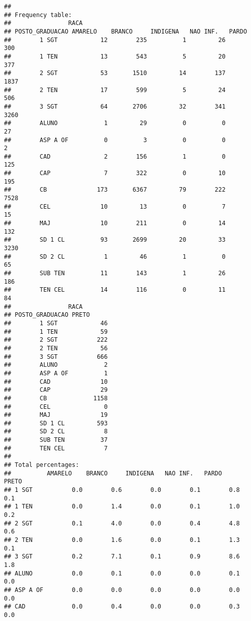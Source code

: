 \documentclass[
]{article}
\begin{document}
\begin{verbatim}
## 
## Frequency table:
##                RACA
## POSTO_GRADUACAO AMARELO    BRANCO     INDIGENA   NAO INF.   PARDO     
##        1 SGT            12        235          1         26        300
##        1 TEN            13        543          5         20        377
##        2 SGT            53       1510         14        137       1837
##        2 TEN            17        599          5         24        506
##        3 SGT            64       2706         32        341       3260
##        ALUNO             1         29          0          0         27
##        ASP A OF          0          3          0          0          2
##        CAD               2        156          1          0        125
##        CAP               7        322          0         10        195
##        CB              173       6367         79        222       7528
##        CEL              10         13          0          7         15
##        MAJ              10        211          0         14        132
##        SD 1 CL          93       2699         20         33       3230
##        SD 2 CL           1         46          1          0         65
##        SUB TEN          11        143          1         26        186
##        TEN CEL          14        116          0         11         84
##                RACA
## POSTO_GRADUACAO PRETO     
##        1 SGT            46
##        1 TEN            59
##        2 SGT           222
##        2 TEN            56
##        3 SGT           666
##        ALUNO             2
##        ASP A OF          1
##        CAD              10
##        CAP              29
##        CB             1158
##        CEL               0
##        MAJ              19
##        SD 1 CL         593
##        SD 2 CL           8
##        SUB TEN          37
##        TEN CEL           7
## 
## Total percentages:
##          AMARELO    BRANCO     INDIGENA   NAO INF.   PARDO      PRETO     
## 1 SGT           0.0        0.6        0.0        0.1        0.8        0.1
## 1 TEN           0.0        1.4        0.0        0.1        1.0        0.2
## 2 SGT           0.1        4.0        0.0        0.4        4.8        0.6
## 2 TEN           0.0        1.6        0.0        0.1        1.3        0.1
## 3 SGT           0.2        7.1        0.1        0.9        8.6        1.8
## ALUNO           0.0        0.1        0.0        0.0        0.1        0.0
## ASP A OF        0.0        0.0        0.0        0.0        0.0        0.0
## CAD             0.0        0.4        0.0        0.0        0.3        0.0

\end{verbatim}
\end{document}

